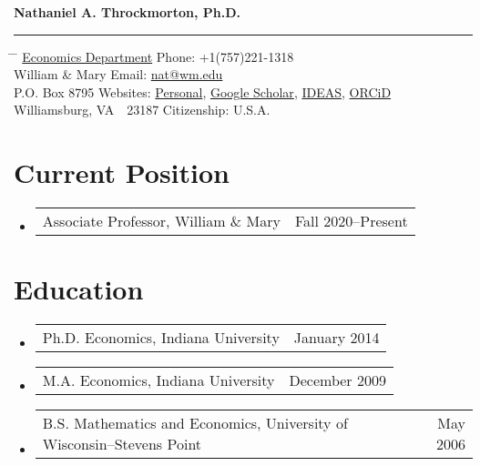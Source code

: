 \documentclass[10pt,letterpaper,en-US]{article}
\makeatletter
\newcommand{\name}{Nathaniel A. Throckmorton, Ph.D.}
\newcommand{\itemrow}[2]
{\begin{tabular*}{\linewidth}{l@{\extracolsep{\fill}}r}
	#1 & #2 \\
\end{tabular*}}
\makeatother
\begin{document}
{\Large \textbf{\name}}
\vspace{4pt}
\hrule
\vspace{-4pt}
\begin{tabbing}
    \hspace{3.25in}         	\=  \hspace{3.25in}  \= \kill
    \href{https://www.wm.edu/as/economics/}{Economics Department} 	\>  Phone: +1(757)221-1318                     \\
    William \& Mary             \>  Email: \href{mailto:nat@wm.edu}{nat@wm.edu}          \\
    P.O. Box 8795  				\>  Websites: \href{https://nathrockmorton.people.wm.edu/}{Personal}, \href{https://scholar.google.com/citations?user=OYdRwzYAAAAJ}{Google Scholar}, \href{https://ideas.repec.org/f/pth237.html}{IDEAS}, \href{https://orcid.org/0000-0002-9671-757X}{ORCiD} \\
    Williamsburg, VA~~23187	    \>  Citizenship: U.S.A.
\end{tabbing}

\section*{Current Position}
\begin{itemize}
	\item \itemrow{Associate Professor, William \& Mary}{Fall 2020--Present}
\end{itemize}

\section*{Education}
\begin{itemize}
	\item
    \itemrow{Ph.D. Economics, Indiana University}{January 2014}
	\item
    \itemrow{M.A. Economics, Indiana University}{December 2009}
	\item
    \itemrow{B.S. Mathematics and Economics, University of Wisconsin--Stevens Point}{May 2006}
\end{itemize}
\end{document}
